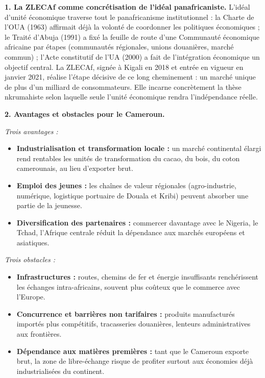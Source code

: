 \documentclass[11pt]{article}
\begin{document}
\begin{corrige}

\textbf{1. La ZLECAf comme concrétisation de l'idéal panafricaniste.} L'idéal d'unité économique traverse tout le panafricanisme institutionnel : la Charte de l'OUA (1963) affirmait déjà la volonté de coordonner les politiques économiques ; le Traité d'Abuja (1991) a fixé la feuille de route d'une Communauté économique africaine par étapes (communautés régionales, unions douanières, marché commun) ; l'Acte constitutif de l'UA (2000) a fait de l'intégration économique un objectif central. La ZLECAf, signée à Kigali en 2018 et entrée en vigueur en janvier 2021, réalise l'étape décisive de ce long cheminement : un marché unique de plus d'un milliard de consommateurs. Elle incarne concrètement la thèse nkrumahiste selon laquelle seule l'unité économique rendra l'indépendance réelle.

\textbf{2. Avantages et obstacles pour le Cameroun.}

\emph{Trois avantages :}
\begin{itemize}
\item \textbf{Industrialisation et transformation locale :} un marché continental élargi rend rentables les unités de transformation du cacao, du bois, du coton camerounais, au lieu d'exporter brut.
\item \textbf{Emploi des jeunes :} les chaînes de valeur régionales (agro-industrie, numérique, logistique portuaire de Douala et Kribi) peuvent absorber une partie de la jeunesse.
\item \textbf{Diversification des partenaires :} commercer davantage avec le Nigeria, le Tchad, l'Afrique centrale réduit la dépendance aux marchés européens et asiatiques.
\end{itemize}

\emph{Trois obstacles :}
\begin{itemize}
\item \textbf{Infrastructures :} routes, chemins de fer et énergie insuffisants renchérissent les échanges intra-africains, souvent plus coûteux que le commerce avec l'Europe.
\item \textbf{Concurrence et barrières non tarifaires :} produits manufacturés importés plus compétitifs, tracasseries douanières, lenteurs administratives aux frontières.
\item \textbf{Dépendance aux matières premières :} tant que le Cameroun exporte brut, la zone de libre-échange risque de profiter surtout aux économies déjà industrialisées du continent.
\end{itemize}


\end{corrige}
\end{document}
